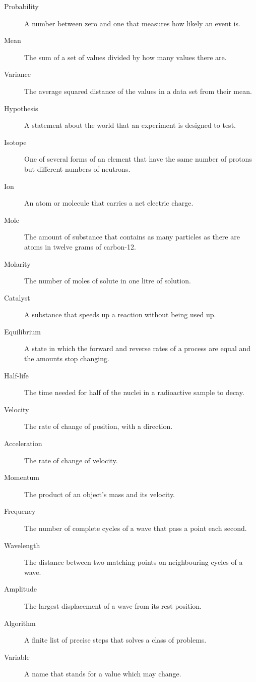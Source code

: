 \documentclass[11pt]{article}
\begin{document}
\begin{description}
\item[Probability] A number between zero and one that measures how likely an event is.

\item[Mean] The sum of a set of values divided by how many values there are.

\item[Variance] The average squared distance of the values in a data set from their mean.

\item[Hypothesis] A statement about the world that an experiment is designed to test.

\item[Isotope] One of several forms of an element that have the same number of protons but different numbers of neutrons.

\item[Ion] An atom or molecule that carries a net electric charge.

\item[Mole] The amount of substance that contains as many particles as there are atoms in twelve grams of carbon-12.

\item[Molarity] The number of moles of solute in one litre of solution.

\item[Catalyst] A substance that speeds up a reaction without being used up.

\item[Equilibrium] A state in which the forward and reverse rates of a process are equal and the amounts stop changing.

\item[Half-life] The time needed for half of the nuclei in a radioactive sample to decay.

\item[Velocity] The rate of change of position, with a direction.

\item[Acceleration] The rate of change of velocity.

\item[Momentum] The product of an object's mass and its velocity.

\item[Frequency] The number of complete cycles of a wave that pass a point each second.

\item[Wavelength] The distance between two matching points on neighbouring cycles of a wave.

\item[Amplitude] The largest displacement of a wave from its rest position.

\item[Algorithm] A finite list of precise steps that solves a class of problems.

\item[Variable] A name that stands for a value which may change.

\end{description}
\end{document}
